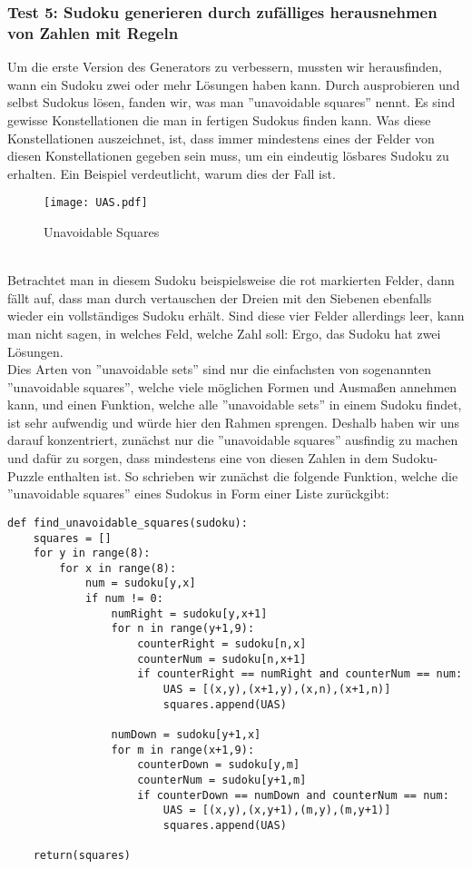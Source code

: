 \documentclass[11pt,a4paper]{article}
\begin{document}
\subsubsection{Test 5: Sudoku generieren durch zufälliges herausnehmen von Zahlen mit Regeln}
Um die erste Version des Generators zu verbessern, mussten wir herausfinden, wann ein Sudoku zwei oder mehr Lösungen haben kann. Durch ausprobieren und selbst Sudokus lösen, fanden wir, was man ''unavoidable squares'' nennt. Es sind gewisse Konstellationen die man in fertigen Sudokus finden kann. Was diese Konstellationen auszeichnet, ist, dass immer mindestens eines der Felder von diesen Konstellationen gegeben sein muss, um ein eindeutig lösbares Sudoku zu erhalten. Ein Beispiel verdeutlicht, warum dies der Fall ist. 
\ \\
\begin{figure}[htbp!]
\begin{center}
\texttt{[image: UAS.pdf]}
\end{center}
\caption{Unavoidable Squares}
\end{figure}
\ \\
Betrachtet man in diesem Sudoku beispielsweise die rot markierten Felder, dann fällt auf, dass man durch vertauschen der Dreien mit den Siebenen ebenfalls wieder ein vollständiges Sudoku erhält. Sind diese vier Felder allerdings leer, kann man nicht sagen, in welches Feld, welche Zahl soll: Ergo, das Sudoku hat zwei Lösungen.\\
Dies Arten von ''unavoidable sets'' sind nur die einfachsten von sogenannten ''unavoidable squares'', welche viele möglichen Formen und Ausmaßen annehmen kann,  und einen Funktion, welche alle ''unavoidable sets'' in einem Sudoku findet, ist sehr aufwendig und würde hier den Rahmen sprengen. Deshalb haben wir uns darauf konzentriert, zunächst nur die ''unavoidable squares'' ausfindig zu machen und dafür zu sorgen, dass mindestens eine von diesen Zahlen in dem Sudoku-Puzzle enthalten ist. So schrieben wir zunächst die folgende Funktion, welche die ''unavoidable squares'' eines Sudokus in Form einer Liste zurückgibt:
\ \\
\begin{verbatim}   
def find_unavoidable_squares(sudoku):
    squares = []
    for y in range(8):
        for x in range(8):
            num = sudoku[y,x]
            if num != 0:
                numRight = sudoku[y,x+1]
                for n in range(y+1,9):
                    counterRight = sudoku[n,x]
                    counterNum = sudoku[n,x+1]
                    if counterRight == numRight and counterNum == num:
                        UAS = [(x,y),(x+1,y),(x,n),(x+1,n)]
                        squares.append(UAS)
            
                numDown = sudoku[y+1,x]
                for m in range(x+1,9):
                    counterDown = sudoku[y,m]
                    counterNum = sudoku[y+1,m]
                    if counterDown == numDown and counterNum == num:
                        UAS = [(x,y),(x,y+1),(m,y),(m,y+1)]
                        squares.append(UAS)
            
    return(squares)
\end{verbatim}
\end{document}
